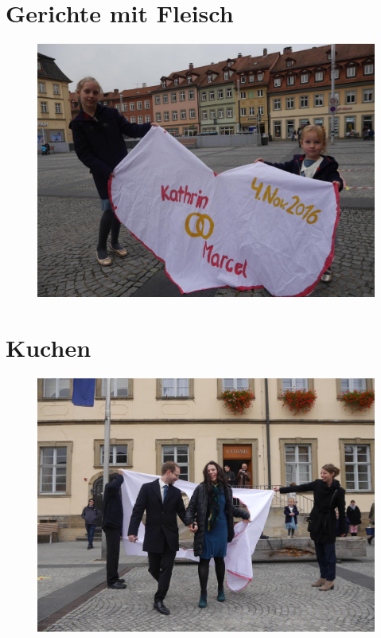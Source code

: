 \documentclass[%
a4paper,
twoside,
12pt
]{article}
\begin{document}
\begin{otherlanguage}{ngerman}
\section{Gerichte mit Fleisch}
\begin{figure}[h]
	\includegraphics[width=\textwidth]{pic/fleisch.jpg}
\end{figure}









\cleardoublepage
\section{Kuchen}
\begin{figure}[h]
	\includegraphics[width=\textwidth]{pic/kuchen.jpg}
\end{figure}


\end{otherlanguage}
\end{document}
